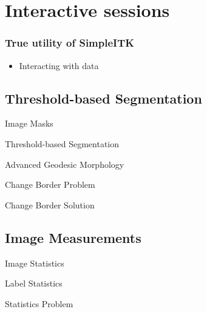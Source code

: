 \section{Interactive sessions}

%
%

\begin{frame}
\frametitle{True utility of SimpleITK}
\begin{itemize}
\item Interacting with data
\end{itemize}
\end{frame}

\subsection{Threshold-based Segmentation}

\begin{frame}{Image Masks}
\end{frame}

\begin{frame}{Threshold-based Segmentation}
\end{frame}


\begin{frame}{Advanced Geodesic Morphology}
\end{frame}

\begin{frame}{Change Border Problem}
\end{frame}

\begin{frame}{Change Border Solution}
\end{frame}

%
%

\subsection{Image Measurements}
\begin{frame}{Image Statistics}
\end{frame}

\begin{frame}{Label Statistics}
\end{frame}


\begin{frame}{Statistics Problem}
\end{frame}

